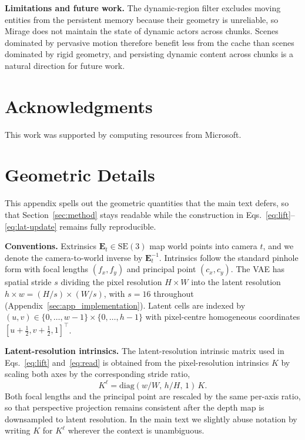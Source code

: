 \documentclass{llmxive}
\providecommand{\method}{Mirage\xspace}
\providecommand{\boldstart}[1]{\vspace{0.1in}\noindent\textbf{#1}}
\begin{document}
\boldstart{Limitations and future work.}
The dynamic-region filter excludes moving entities from the persistent memory because their geometry is unreliable, so \method{} does not maintain the state of dynamic actors across chunks.
Scenes dominated by pervasive motion therefore benefit less from the cache than scenes dominated by rigid geometry, and persisting dynamic content across chunks is a natural direction for future work.
\vspace{1cm}

\section{Acknowledgments}
This work was supported by computing resources from Microsoft.

% 







\appendix

\section{Geometric Details}
\label{sec:app_geometry}

This appendix spells out the geometric quantities that the main text defers, so that Section~\ref{sec:method} stays readable while the construction in Eqs.~\ref{eq:lift}--\ref{eq:lat-update} remains fully reproducible.

\boldstart{Conventions.}
Extrinsics $\mathbf{E}_t \in \mathrm{SE}(3)$ map world points into camera $t$, and we denote the camera-to-world inverse by $\mathbf{E}_t^{-1}$.
Intrinsics follow the standard pinhole form with focal lengths $(f_x, f_y)$ and principal point $(c_x, c_y)$.
The VAE has spatial stride $s$ dividing the pixel resolution $H \times W$ into the latent resolution $h \times w = (H/s) \times (W/s)$, with $s = 16$ throughout (Appendix~\ref{sec:app_implementation}).
Latent cells are indexed by $(u, v) \in \{0, \dots, w-1\} \times \{0, \dots, h-1\}$ with pixel-centre homogeneous coordinates $[u + \tfrac{1}{2}, v + \tfrac{1}{2}, 1]^\top$.

\boldstart{Latent-resolution intrinsics.}
The latent-resolution intrinsic matrix used in Eqs.~\ref{eq:lift} and~\ref{eq:read} is obtained from the pixel-resolution intrinsics $K$ by scaling both axes by the corresponding stride ratio,
\begin{equation}
K^{\ell} = \mathrm{diag}(w/W,\, h/H,\, 1)\, K.
\end{equation}
Both focal lengths and the principal point are rescaled by the same per-axis ratio, so that perspective projection remains consistent after the depth map is downsampled to latent resolution.
In the main text we slightly abuse notation by writing $K$ for $K^{\ell}$ wherever the context is unambiguous.
\end{document}
